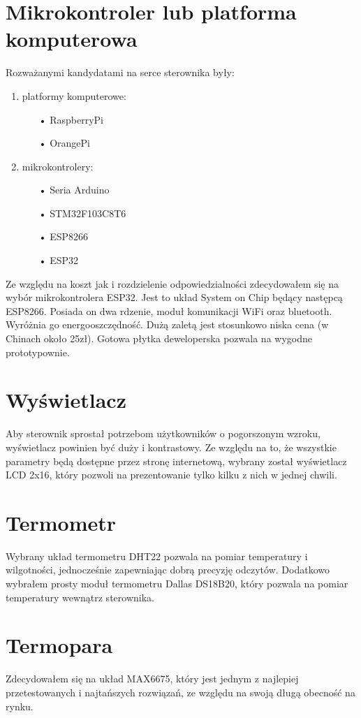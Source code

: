 \documentclass[11pt]{report}
\begin{document}
 \section{Mikrokontroler lub platforma komputerowa}
 Rozważanymi kandydatami na serce sterownika były:
 \begin{enumerate}
 \item platformy komputerowe:
 \begin{enumerate}
 \item[•] RaspberryPi
 \item[•] OrangePi
 \end{enumerate}
\item mikrokontrolery:
 \begin{enumerate}
 \item[•] Seria Arduino
 \item[•] STM32F103C8T6
 \item[•] ESP8266
 \item[•] ESP32
 \end{enumerate}
 \end{enumerate}
 Ze względu na koszt jak i rozdzielenie odpowiedzialności zdecydowałem się na wybór mikrokontrolera ESP32. Jest to układ System on Chip będący następcą ESP8266. Posiada on dwa rdzenie, moduł komunikacji WiFi oraz bluetooth. Wyróżnia go energooszczędność. Dużą zaletą jest stosunkowo niska cena (w Chinach około 25zł). Gotowa płytka deweloperska pozwala na wygodne prototypownie.
 
 \section{Wyświetlacz}
 Aby sterownik sprostał potrzebom użytkowników o pogorszonym wzroku, wyświetlacz powinien być duży i kontrastowy.
 Ze względu na to, że wszystkie parametry będą dostępne przez stronę internetową, wybrany został wyświetlacz LCD 2x16, który pozwoli na prezentowanie tylko kilku z nich w jednej chwili.
 
 \section{Termometr}
 Wybrany układ termometru DHT22 pozwala na pomiar temperatury i wilgotności, jednocześnie zapewniając dobrą precyzję odczytów. Dodatkowo wybrałem prosty moduł termometru Dallas DS18B20, który pozwala na pomiar temperatury wewnątrz sterownika.
 
 \section{Termopara}
 Zdecydowałem się na układ MAX6675, który jest jednym z najlepiej przetestowanych i najtańszych rozwiązań, ze względu na swoją długą obecność na rynku.
 
\end{document}
